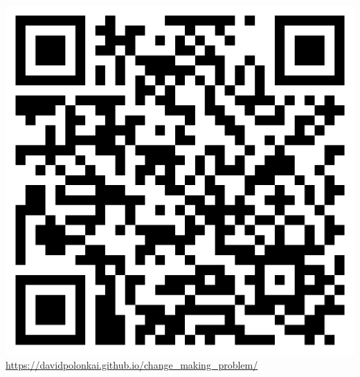 \documentclass{beamer}
\begin{document}
\begin{frame}
    \centering
    \includegraphics[scale=0.2]{qrcode.png}\\
    \small\url{https://davidpolonkai.github.io/change_making_problem/}
\end{frame}
\end{document}
